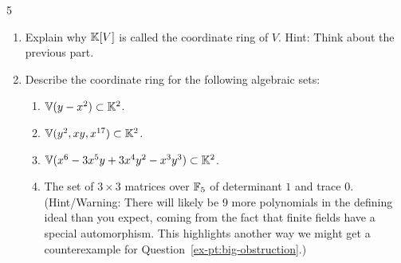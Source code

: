 \documentclass[Notebook.tex]{subfiles}
\begin{document}
\begin{problem}{5}
\begin{enumerate}[label=(\alph*),ref=\theenumi\alph*]
        \item Explain why $\mathbb K[V]$ is called the coordinate ring of $V$. Hint: Think about the previous part.
        \item Describe the coordinate ring for the following algebraic sets:
        \begin{enumerate}[label=(\roman*), ref=\theenumi\roman*]
            \item $\mathbb V(y-x^2) \subset \mathbb K^2$.
            \item $\mathbb V(y^2, xy, x^{17}) \subset \mathbb K^2$.
            \item $\mathbb V(x^6 - 3 x^5 y + 3 x^4 y^2 - x^3 y^3) \subset \mathbb K^2$.
            \item The set of $3\times 3$ matrices over $\mathbb F_5$ of determinant $1$ and trace $0$. (Hint/Warning: There will likely be 9 more polynomials in the defining ideal than you expect, coming from the fact that finite fields have a special automorphism. This highlights another way we might get a counterexample for Question~\ref{ex-pt:big-obstruction}.)
        \end{enumerate}
    \end{enumerate}
\end{problem}
\end{document}

